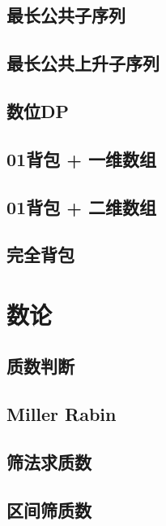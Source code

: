 \documentclass[a4paper, 12pt, twoside]{article}
\begin{document}
\subsection{最长公共子序列}

\subsection{最长公共上升子序列}

\subsection{数位DP}

\subsection{01背包 + 一维数组}

\subsection{01背包 + 二维数组}

\subsection{完全背包}


\section{数论}
\subsection{质数判断}

\subsection{Miller Rabin}

\subsection{筛法求质数}

\subsection{区间筛质数}

\end{document}
